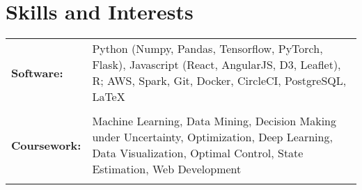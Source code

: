 \documentclass[a4paper,10pt]{article}
\begin{document}









\section{Skills and Interests}
\begin{tabularx}{\textwidth}{lX}
\bf{Software:}& Python (Numpy, Pandas, Tensorflow, PyTorch, Flask), Javascript (React, AngularJS, D3, Leaflet), R; AWS, Spark, Git, Docker, CircleCI, PostgreSQL, \LaTeX \\ \\ 

 \bf{Coursework:}& Machine Learning, Data Mining, Decision Making under Uncertainty, Optimization, Deep Learning, Data Visualization, Optimal Control, State Estimation, Web Development\\ \\ 


\end{tabularx}

\nocite{*}


\end{document}
